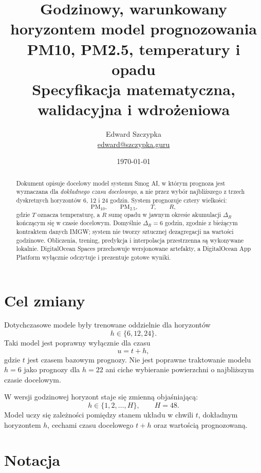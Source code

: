 \documentclass[11pt,a4paper,oneside]{article}
\title{\textbf{Godzinowy, warunkowany horyzontem model prognozowania}\\
\textbf{PM10, PM2.5, temperatury i opadu}\\[0.4em]
\large Specyfikacja matematyczna, walidacyjna i wdrożeniowa}
\author{Edward Szczypka\\\href{mailto:edward@szczypka.guru}{edward@szczypka.guru}}
\date{\today}
\newcommand{\PMten}{\mathrm{PM}_{10}}
\newcommand{\PMtwo}{\mathrm{PM}_{2.5}}
\begin{document}
\maketitle

\begin{abstract}
Dokument opisuje docelowy model systemu Smog AI, w którym prognoza jest
wyznaczana dla \emph{dokładnego czasu docelowego}, a nie przez wybór najbliższego
z trzech dyskretnych horyzontów 6, 12 i 24 godzin. System prognozuje cztery
wielkości:
\[
  \PMten,\qquad \PMtwo,\qquad T,\qquad R,
\]
gdzie $T$ oznacza temperaturę, a $R$ sumę opadu w jawnym okresie akumulacji
$\Delta_R$ kończącym się w czasie docelowym. Domyślnie $\Delta_R=6$ godzin,
zgodnie z bieżącym kontraktem danych IMGW; system nie tworzy sztucznej
dezagregacji na wartości godzinowe. Obliczenia, trening, predykcja i
interpolacja przestrzenna są
wykonywane lokalnie. DigitalOcean Spaces przechowuje wersjonowane artefakty,
a DigitalOcean App Platform wyłącznie odczytuje i prezentuje gotowe wyniki.
\end{abstract}

\tableofcontents
\newpage

\section{Cel zmiany}

Dotychczasowe modele były trenowane oddzielnie dla horyzontów
\[
  h\in\{6,12,24\}.
\]
Taki model jest poprawny wyłącznie dla czasu
\[
  u=t+h,
\]
gdzie $t$ jest czasem bazowym prognozy. Nie jest poprawne traktowanie modelu
$h=6$ jako prognozy dla $h=22$ ani ciche wybieranie powierzchni o najbliższym
czasie docelowym.

W wersji godzinowej horyzont staje się zmienną objaśniającą:
\[
  h\in\{1,2,\ldots,H\},\qquad H=48.
\]
Model uczy się zależności pomiędzy stanem układu w chwili $t$, dokładnym
horyzontem $h$, cechami czasu docelowego $t+h$ oraz wartością prognozowaną.

\section{Notacja}
\end{document}
